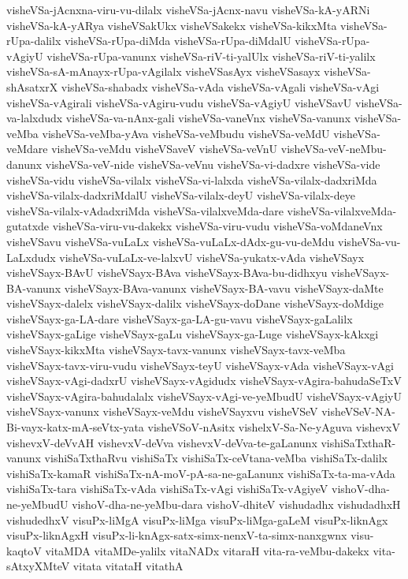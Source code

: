 {visheVSa-jAcnxna-viru-vu-dilalx
visheVSa-jAcnx-navu
visheVSa-kA-yARNi
visheVSa-kA-yARya
visheVSakUkx
visheVSakekx
visheVSa-kikxMta
visheVSa-rUpa-dalilx
visheVSa-rUpa-diMda
visheVSa-rUpa-diMdalU
visheVSa-rUpa-vAgiyU
visheVSa-rUpa-vanunx
visheVSa-riV-ti-yalUlx
visheVSa-riV-ti-yalilx
visheVSa-sA-mAnayx-rUpa-vAgilalx
visheVSasAyx
visheVSasayx
visheVSa-shAsatxrX
visheVSa-shabadx
visheVSa-vAda
visheVSa-vAgali
visheVSa-vAgi
visheVSa-vAgirali
visheVSa-vAgiru-vudu
visheVSa-vAgiyU
visheVSavU
visheVSa-va-lalxdudx
visheVSa-va-nAnx-gali
visheVSa-vaneVnx
visheVSa-vanunx
visheVSa-veMba
visheVSa-veMba-yAva
visheVSa-veMbudu
visheVSa-veMdU
visheVSa-veMdare
visheVSa-veMdu
visheVSaveV
visheVSa-veVnU
visheVSa-veV-neMbu-danunx
visheVSa-veV-nide
visheVSa-veVnu
visheVSa-vi-dadxre
visheVSa-vide
visheVSa-vidu
visheVSa-vilalx
visheVSa-vi-lalxda
visheVSa-vilalx-dadxriMda
visheVSa-vilalx-dadxriMdalU
visheVSa-vilalx-deyU
visheVSa-vilalx-deye
visheVSa-vilalx-vAdadxriMda
visheVSa-vilalxveMda-dare
visheVSa-vilalxveMda-gutatxde
visheVSa-viru-vu-dakekx
visheVSa-viru-vudu
visheVSa-voMdaneVnx
visheVSavu
visheVSa-vuLaLx
visheVSa-vuLaLx-dAdx-gu-vu-deMdu
visheVSa-vu-LaLxdudx
visheVSa-vuLaLx-ve-lalxvU
visheVSa-yukatx-vAda
visheVSayx
visheVSayx-BAvU
visheVSayx-BAva
visheVSayx-BAva-bu-didhxyu
visheVSayx-BA-vanunx
visheVSayx-BAva-vanunx
visheVSayx-BA-vavu
visheVSayx-daMte
visheVSayx-dalelx
visheVSayx-dalilx
visheVSayx-doDane
visheVSayx-doMdige
visheVSayx-ga-LA-dare
visheVSayx-ga-LA-gu-vavu
visheVSayx-gaLalilx
visheVSayx-gaLige
visheVSayx-gaLu
visheVSayx-ga-Luge
visheVSayx-kAkxgi
visheVSayx-kikxMta
visheVSayx-tavx-vanunx
visheVSayx-tavx-veMba
visheVSayx-tavx-viru-vudu
visheVSayx-teyU
visheVSayx-vAda
visheVSayx-vAgi
visheVSayx-vAgi-dadxrU
visheVSayx-vAgidudx
visheVSayx-vAgira-bahudaSeTxV
visheVSayx-vAgira-bahudalalx
visheVSayx-vAgi-ve-yeMbudU
visheVSayx-vAgiyU
visheVSayx-vanunx
visheVSayx-veMdu
visheVSayxvu
visheVSeV
visheVSeV-NA-Bi-vayx-katx-mA-seVtx-yata
visheVSoV-nAsitx
vishelxV-Sa-Ne-yAguva
vishevxV
vishevxV-deVvAH
vishevxV-deVva
vishevxV-deVva-te-gaLanunx
vishiSaTxthaR-vanunx
vishiSaTxthaRvu
vishiSaTx
vishiSaTx-ceVtana-veMba
vishiSaTx-dalilx
vishiSaTx-kamaR
vishiSaTx-nA-moV-pA-sa-ne-gaLanunx
vishiSaTx-ta-ma-vAda
vishiSaTx-tara
vishiSaTx-vAda
vishiSaTx-vAgi
vishiSaTx-vAgiyeV
vishoV-dha-ne-yeMbudU
vishoV-dha-ne-yeMbu-dara
vishoV-dhiteV
vishudadhx
vishudadhxH
vishudedhxV
visuPx-liMgA
visuPx-liMga
visuPx-liMga-gaLeM
visuPx-liknAgx
visuPx-liknAgxH
visuPx-li-knAgx-satx-simx-nenxV-ta-simx-nanxgwnx
visu-kaqtoV
vitaMDA
vitaMDe-yalilx
vitaNADx
vitaraH
vita-ra-veMbu-dakekx
vita-sAtxyXMteV
vitata
vitataH
vitathA
}
